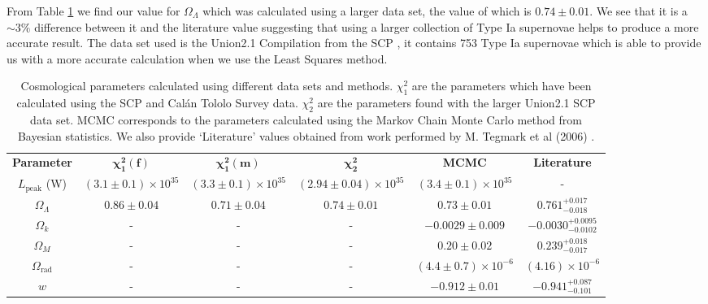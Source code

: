 \documentclass[twocolumn]{revtex4}
\begin{document}
From Table \ref{table:cosmo_parameters} we find our value for $\Omega_\Lambda$ which was calculated using a larger data set, the value of which is $0.74\pm0.01$. We see that it is a $\sim 3\%$ difference between it and the literature value suggesting that using a larger collection of Type Ia supernovae helps to produce a more accurate result. The data set used is the Union2.1 Compilation from the SCP \cite{dataset_2}, it contains 753 Type Ia supernovae which is able to provide us with a more accurate calculation when we use the Least Squares method.

{\renewcommand{\arraystretch}{1.2}%
\begin{table}[t]
\centering
\begin{tabular}{c@{\hskip 15pt}c@{\hskip 15pt}c@{\hskip 15pt}c@{\hskip 15pt}c@{\hskip 15pt}c} 
 \hline
 \textbf{Parameter} & \textbf{$\boldsymbol{\chi^2_{1}(f)}$} & \textbf{$\boldsymbol{\chi^2_{1}(m)}$} & \textbf{$\boldsymbol{\chi^2_2}$} & \textbf{MCMC} & \textbf{Literature} \\ [0.5ex] 
 $L_{\text{peak}}$ (W) & $(3.1\pm0.1)\times 10^{35}$ & $(3.3\pm0.1)\times 10^{35}$ & $(2.94\pm0.04)\times 10^{35}$ & $(3.4\pm0.1 ) \times 10^{35}$ & -\\
 $\Omega_\Lambda$ & $0.86\pm0.04$ &  $0.71\pm0.04$ & $0.74\pm0.01$ & $0.73\pm0.01$ & $0.761^{+0.017}_{-0.018}$ \\
 $\Omega_k$ & - & - & - & $-0.0029\pm0.009$ & $-0.0030^{+0.0095}_{-0.0102}$ \\
 $\Omega_M$ & - & - & - & $0.20\pm0.02$ & $0.239^{+0.018}_{-0.017}$ \\
 $\Omega_\text{rad}$ & - & - & - & $(4.4\pm0.7)\times10^{-6}$ & $(4.16)\times10^{-6}$ \\
 $w$ & - & - & - & $-0.912\pm0.01$ & $-0.941^{+0.087}_{-0.101}$ \\
 \hline
\end{tabular}
\caption{Cosmological parameters calculated using different data sets and methods. $\chi^2_1$ are the parameters which have been calculated using the SCP and Cal\'{a}n Tololo Survey data. $\chi^2_2$ are the parameters found with the larger Union2.1 SCP data set. MCMC corresponds to the parameters calculated using the Markov Chain Monte Carlo method from Bayesian statistics. We also provide `Literature' values obtained from work performed by M. Tegmark et al (2006) \cite{cosmo_constraints}.}
\vspace{-0.5em}
\label{table:cosmo_parameters}
\end{table}

}
\end{document}

